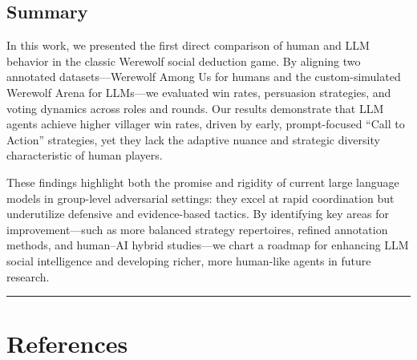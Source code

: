 \documentclass[
  letterpaper,
  DIV=11,
  numbers=noendperiod,
  oneside]{scrreprt}
\begin{document}
\section{Summary}\label{summary}

In this work, we presented the first direct comparison of human and LLM
behavior in the classic Werewolf social deduction game. By aligning two
annotated datasets---Werewolf Among Us for humans and the
custom-simulated Werewolf Arena for LLMs---we evaluated win rates,
persuasion strategies, and voting dynamics across roles and rounds. Our
results demonstrate that LLM agents achieve higher villager win rates,
driven by early, prompt-focused ``Call to Action'' strategies, yet they
lack the adaptive nuance and strategic diversity characteristic of human
players.

These findings highlight both the promise and rigidity of current large
language models in group-level adversarial settings: they excel at rapid
coordination but underutilize defensive and evidence-based tactics. By
identifying key areas for improvement---such as more balanced strategy
repertoires, refined annotation methods, and human--AI hybrid
studies---we chart a roadmap for enhancing LLM social intelligence and
developing richer, more human-like agents in future research.

\begin{center}\rule{0.5\linewidth}{0.5pt}\end{center}

\chapter{References}\label{references}
\end{document}
